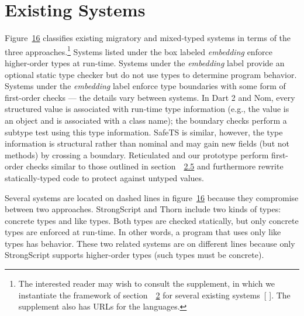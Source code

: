 \documentclass[screen=true, 10pt, acmsmall]{acmart}
\newcommand{\sectionNewpage}{}
\newcommand{\ChapRef}[2]{\SecRef{#1}{#2}}
\newcommand{\SecRef}[2]{section~#1}
\newcommand{\SectionNumberLink}[2]{\hyperref[#1]{#2}}
\let\SOriginalthesubsection\thesubsection
\newcommand{\Ssection}[2]{\section[#1]{#2}\let\thesubsection\SOriginalthesubsection}
\newcommand{\AutobibLink}[1]{\color{ACMPurple}{#1}}
\newcommand{\FigureRef}[2]{#1}
\newcommand{\NoteBox}[1]{\footnote{#1}}
\newcommand{\NoteContent}[1]{#1}
\newcommand{\Autobibref}[1]{#1}
\providecommand{\AutobibLink}[1]{#1}
\renewcommand{\SecRef}[2]{~#1}
\newcommand{\FOlong}{First-Order}
\newcommand{\holong}{higher-order}
\newcommand{\eolong}{erasure}
\newcommand{\folong}{first-order}
\newcommand{\foshort}{1}
\begin{document}
\sectionNewpage

\Ssection{Existing Systems}{Existing Systems}\label{t:x28part_x22secx3aexistingx2dsystemsx22x29}

Figure~\hyperref[t:x28counter_x28x22figurex22_x22figx3aexistingx2dsystemsx22x29x29]{\FigureRef{16}{t:x28counter_x28x22figurex22_x22figx3aexistingx2dsystemsx22x29x29}} classifies existing migratory and mixed{-}typed
 systems in terms of the three approaches.\NoteBox{\NoteContent{The interested reader may
wish to consult the supplement, in which we instantiate
the framework of section~\ChapRef{\SectionNumberLink{t:x28part_x22secx3adesignx22x29}{2}}{Syntax, Types, and Semantics} for several existing systems\Autobibref{~[\hyperref[t:x28autobib_x22Ben_Greenman_and_Matthias_FelleisenA_Spectrum_of_Type_Soundness_and_Performance_Supplementary_MaterialNortheastern_Universityx2c_NUx2dCCISx2d2018x2d0022018x22x29]{\AutobibLink{Greenman and Felleisen}} \hyperref[t:x28autobib_x22Ben_Greenman_and_Matthias_FelleisenA_Spectrum_of_Type_Soundness_and_Performance_Supplementary_MaterialNortheastern_Universityx2c_NUx2dCCISx2d2018x2d0022018x22x29]{\AutobibLink{2018}}]}.
The supplement also has URLs for the languages.}}
Systems listed under the box labeled \textit{\relax{\holong} embedding} enforce
 higher{-}order types at run{-}time.
Systems under the \textit{\relax{\eolong} embedding} label provide an optional static type checker
 but do not use types to determine program behavior.
Systems under the \textit{\relax{\folong} embedding} label enforce type boundaries
 with some form of first{-}order checks {---} the details vary between systems.
In Dart 2 and Nom,
 every structured value is associated with run{-}time type
 information (e.g., the value is an object and is associated with a class name);
 the boundary checks perform a subtype test using this type information.
SafeTS is similar, however, the type information is structural rather than
 nominal and may gain new fields (but not methods) by crossing a boundary.
Reticulated and our \relax{$\mathsf{TR}\mhyphen\mathsf{\foshort}$} prototype perform first{-}order checks similar
 to those outlined in section~\SecRef{\SectionNumberLink{t:x28part_x22secx3alocallyx2ddefensivex2dembeddingx22x29}{2.5}}{\relax{\FOlong} Embedding} and
 furthermore rewrite statically{-}typed code to protect against untyped
 values.

Several systems are located on dashed lines in figure~\hyperref[t:x28counter_x28x22figurex22_x22figx3aexistingx2dsystemsx22x29x29]{\FigureRef{16}{t:x28counter_x28x22figurex22_x22figx3aexistingx2dsystemsx22x29x29}}
 because they compromise between two approaches.
StrongScript and Thorn include two kinds of types: concrete types and like types.
Both types are checked statically, but only concrete types are enforced at
 run{-}time.
In other words, a program that uses only like types has \relax{\eolong} behavior.
These two related systems are on different lines because only StrongScript supports
 higher{-}order types (such types must be concrete).
\end{document}
